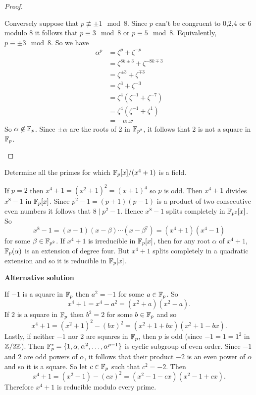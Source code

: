 \begin{proof}
\begin{enumerate}
            Conversely suppose that $p\not\equiv\pm 1\mod 8$. 
            Since $p$ can't be congruent to 0,2,4 or 6 modulo 8 it follows that $p\equiv 3\mod 8$ or $p\equiv 5\mod 8$.
            Equivalently, $p\equiv\pm 3\mod 8$. So we have
            \begin{align*}
                \alpha^p&=\zeta^p+\zeta^{-p}\\
                &=\zeta^{8k\pm 3}+\zeta^{-8k\mp 3}\\
                &=\zeta^{\pm 3}+\zeta^{\mp 3}\\
                &=\zeta^3+\zeta^{-3}\\
                &=\zeta^4\left(\zeta^{-1}+\zeta^{-7}\right)\\
                &=\zeta^4\left(\zeta^{-1}+\zeta^1\right)\\
                &=-\alpha.x
            \end{align*}
            So $\alpha\not\in\mathbb{F}_p$. 
            Since $\pm\alpha$ are the roots of 2 in $\mathbb{F}_{p^2}$, it follows that $2$ is not a square in $\mathbb{F}_p$.
    \end{enumerate}
\end{proof}

\begin{ex}{22.15}
    Determine all the primes for which $\mathbb{F}_p[x]/(x^4+1)$ is a field. 
\end{ex}
\begin{sol}
    If $p=2$ then $x^4+1=(x^2+1)^2=(x+1)^4$ so $p$ is odd. 
    Then $x^4+1$ divides $x^8-1$ in $\mathbb{F}_p[x]$. 
    Since $p^2-1=(p+1)(p-1)$ is a product of two consecutive even numbers it follows that $8\mid p^2-1$.
    Hence $x^8-1$ splits completely in $\mathbb{F}_{p^2}[x]$. So
    $$x^8-1=(x-1)(x-\beta)\cdots(x-\beta^7)=(x^4+1)(x^4-1)$$
    for some $\beta\in\mathbb{F}_{p^2}$. 
    If $x^4+1$ is irreducible in $\mathbb{F}_p[x]$, then for any root $\alpha$ of $x^4+1$, $\mathbb{F}_p(\alpha)$ is an extension of degree four.
    But $x^4+1$ splits completely in a quadratic extension and so it is reducible in $\mathbb{F}_p[x]$.

    \noindent\textbf{Alternative solution}
    
    If $-1$ is a square in $\mathbb{F}_p$ then $a^2=-1$ for some $a\in\mathbb{F}_p$. So
    $$x^4+1=x^4-a^2=(x^2+a)(x^2-a).$$
    If $2$ is a square in $\mathbb{F}_p$ then $b^2=2$ for some $b\in\mathbb{F}_p$ and so
    $$x^4+1=(x^2+1)^2-(bx)^2=(x^2+1+bx)(x^2+1-bx).$$
    Lastly, if neither $-1$ nor $2$ are squares in $\mathbb{F}_p$, then $p$ is odd (since $-1=1=1^2$ in $\mathbb{Z}/2\mathbb{Z}$).
    Then $\mathbb{F}_p^*=\{1,\alpha, \alpha^2,\dots,\alpha^{p-1}\}$ is cyclic subgroup of even order. 
    Since $-1$ and $2$ are odd powers of $\alpha$, it follows that their product $-2$ is an even power of $\alpha$ and so it is a square.
    So let $c\in\mathbb{F}_p$ such that $c^2=-2$. Then
    $$x^4+1=(x^2-1)-(cx)^2=(x^2-1-cx)(x^2-1+cx).$$
    Therefore $x^4+1$ is reducible modulo every prime.
\end{sol}

